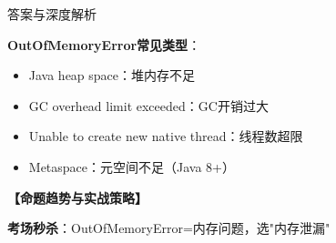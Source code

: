 \documentclass[12pt, a4paper]{ctexart}
\begin{document}
\begin{enumerate}[label=\textbf{\arabic*.}]
\begin{bluebox}{答案与深度解析}
\begin{itemize}[label={}, leftmargin=*, nosep]
		      \textbf{OutOfMemoryError常见类型}：
		      \begin{itemize}[label={}, leftmargin=*, nosep]
			      \item Java heap space：堆内存不足
			      \item GC overhead limit exceeded：GC开销过大
			      \item Unable to create new native thread：线程数超限
			      \item Metaspace：元空间不足（Java 8+）
		      \end{itemize}

		      \textbf{【命题趋势与实战策略】}

		      \textbf{考场秒杀}：OutOfMemoryError=内存问题，选"内存泄漏"
		      \end{itemize}

	      \end{bluebox}

\end{enumerate}
\end{document}
